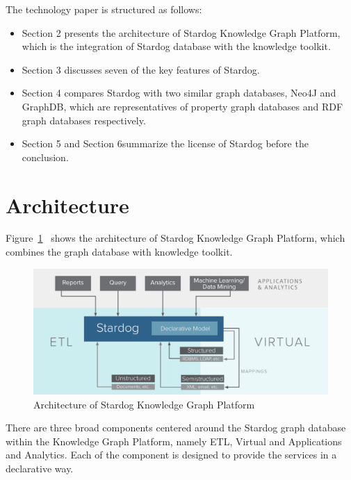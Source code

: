 The technology paper is structured as follows:
\begin{itemize}
	\item Section 2 presents the architecture of Stardog Knowledge Graph 
	Platform, which is the integration of Stardog database with the knowledge 
	toolkit.
	\item Section 3 discusses seven of the key features of Stardog.
	\item Section 4 compares Stardog with two similar graph databases, Neo4J 
	and GraphDB, which are representatives of property graph databases and 
	RDF graph databases respectively.
	\item Section 5 and Section 6summarize the license of Stardog before the 
	conclusion.
\end{itemize}

\section{Architecture}
Figure~\ref{sa:archi}~\cite{hid-sp18-405-blog-stardog-kgraph} shows the 
architecture of Stardog Knowledge Graph Platform, which combines the 
graph database with knowledge toolkit.
\begin{figure}[!ht]
  \centering\includegraphics[width=\columnwidth]{../images/stardog-architecture.png}
  \caption{Architecture of Stardog Knowledge Graph Platform}\label{sa:archi}
\end{figure}
There are three broad components centered around the Stardog graph 
database within the Knowledge Graph Platform, namely ETL, Virtual and 
Applications and Analytics. Each of the component is designed to provide 
the services in a declarative way. 
